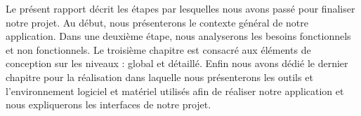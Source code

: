 Le présent rapport décrit les étapes par lesquelles nous avons passé pour finaliser notre projet. Au début, nous présenterons le contexte général de notre application. Dans une deuxième étape, nous analyserons les besoins fonctionnels et non fonctionnels. Le troisième chapitre est consacré aux éléments de conception sur les niveaux : global et détaillé. Enfin nous avons dédié le dernier chapitre pour la réalisation dans laquelle nous présenterons les outils et l’environnement logiciel et matériel utilisés afin de réaliser notre application et nous expliquerons les interfaces de notre projet.

